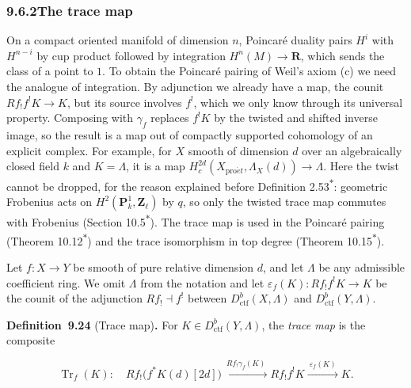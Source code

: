 \documentclass[11pt]{article}
\newenvironment{bpstatement}[2]{\par\addvspace{0.6\baselineskip}\noindent\textbf{#1}#2\textbf{.}\enspace\ignorespaces}
  {\par\addvspace{0.4\baselineskip}}
\newcommand{\bpout}[1]{#1\textsuperscript{\hyperlink{bp-outside}{\ensuremath{\ast}}}}
\begin{document}
\subsubsection*{\texorpdfstring{9.6.2\quad The trace map}{9.6.2 The trace map}}
\label{bp81}%
\label{bp82}%
On a compact oriented manifold of dimension \(n\), Poincaré duality pairs \(H^i\) with \(H^{n-i}\) by cup product followed by integration \(H^n(M)\to\mathbf R\), which sends the class of a point to \(1\). To obtain the Poincaré pairing of Weil's axiom (c) we need the analogue of integration. By adjunction we already have a map, the counit \(Rf_!f^!K\to K\), but its source involves \(f^!\), which we only know through its universal property. Composing with \(\gamma_f\) replaces \(f^!K\) by the twisted and shifted inverse image, so the result is a map out of compactly supported cohomology of an explicit complex. For example, for \(X\) smooth of dimension \(d\) over an algebraically closed field \(k\) and \(K=\Lambda\), it is a map \(H_c^{2d}(X_{\mathrm{pro}\acute{e}t},\Lambda_X(d))\to\Lambda\). Here the twist cannot be dropped, for the reason explained before Definition \bpout{2.53}: geometric Frobenius acts on \(H^2(\mathbf P^1_k,\mathbf Z_\ell)\) by \(q\), so only the twisted trace map commutes with Frobenius (Section \bpout{10.5}). The trace map is used in the Poincaré pairing (Theorem \bpout{10.12}) and the trace isomorphism in top degree (Theorem \bpout{10.15}).

Let \(f:X\to Y\) be smooth of pure relative dimension \(d\), and let \(\Lambda\) be any admissible coefficient ring. We omit \(\Lambda\) from the notation and let \(\varepsilon_f(K):Rf_!f^!K\to K\) be the counit of the adjunction \(Rf_!\dashv f^!\) between \(D^b_{\mathrm{ctf}}(X,\Lambda)\) and \(D^b_{\mathrm{ctf}}(Y,\Lambda)\).

\label{bp83}%
\begin{bpstatement}{Definition~9.24}{ (Trace map)}
For \(K\in D^b_{\mathrm{ctf}}(Y,\Lambda)\), the \emph{trace map} is the composite

\[
\operatorname{Tr}_{f}(K):\quad
Rf_!\bigl(f^{*}K(d)[2d]\bigr)
\xrightarrow{\ Rf_!\gamma_{f}(K)\ }
Rf_!f^!K
\xrightarrow{\ \varepsilon_{f}(K)\ }K.
\tag{9.25}
\]
\end{bpstatement}
\end{document}
